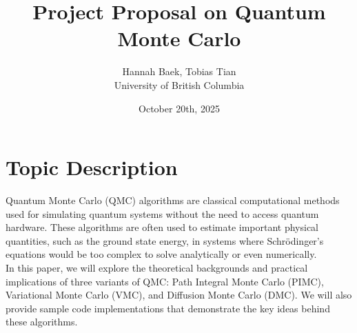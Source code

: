 \documentclass[11pt]{article}
\begin{document}
\title{Project Proposal on Quantum Monte Carlo}

\author{Hannah Baek, Tobias Tian \\
University of British Columbia}

\date{\vspace{-2.5ex} October 20th, 2025}
\maketitle


\section{Topic Description}
Quantum Monte Carlo (QMC) algorithms are classical computational methods used for simulating quantum systems without the need to access quantum hardware. These algorithms are often used to estimate important physical quantities, such as the ground state energy, in systems where Schr\"odinger's equations would be too complex to solve analytically or even numerically. \\
In this paper, we will explore the theoretical backgrounds and practical implications of three variants of QMC: Path Integral Monte Carlo (PIMC), Variational Monte Carlo (VMC), and Diffusion Monte Carlo (DMC). We will also provide sample code implementations that demonstrate the key ideas behind these algorithms.


\end{document}
